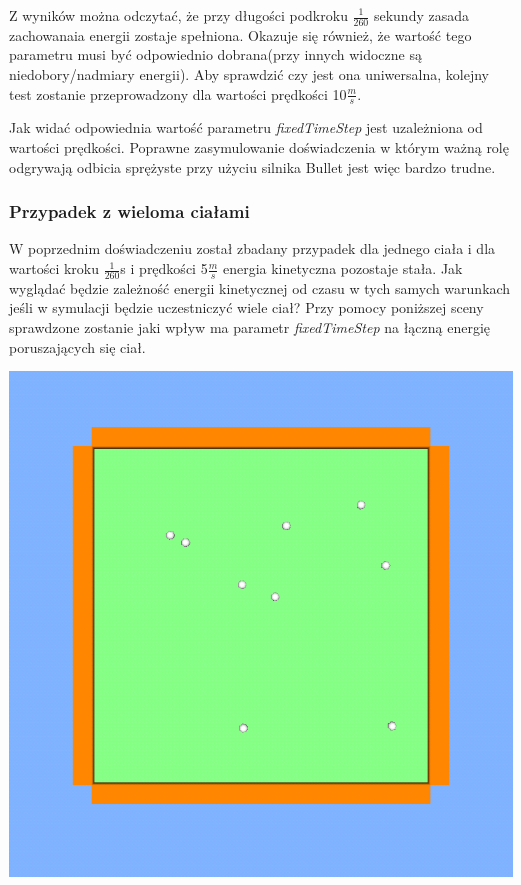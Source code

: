 Z wyników można odczytać, że przy długości podkroku $ \frac{1}{260} $ sekundy
zasada zachowanaia energii zostaje spełniona. Okazuje się również, że wartość
tego parametru musi być odpowiednio dobrana(przy innych widoczne są
niedobory/nadmiary energii). Aby sprawdzić czy jest ona uniwersalna, kolejny
test zostanie przeprowadzony dla wartości prędkości 10$\frac{m}{s}$.



Jak widać odpowiednia wartość parametru \emph{fixedTimeStep} jest uzależniona od
wartości prędkości. Poprawne zasymulowanie doświadczenia w którym ważną rolę
odgrywają odbicia sprężyste przy użyciu silnika Bullet jest więc bardzo trudne.

\subsubsection{Przypadek z wieloma ciałami}

W poprzednim doświadczeniu został zbadany przypadek dla jednego ciała i dla
wartości kroku $ \frac{1}{260} $s i prędkości 5$ \frac{m}{s} $ energia
kinetyczna pozostaje stała. Jak wyglądać będzie zależność energii kinetycznej od
czasu w tych samych warunkach jeśli w symulacji będzie uczestniczyć wiele ciał?
Przy pomocy poniższej sceny sprawdzone zostanie jaki wpływ ma parametr
\emph{fixedTimeStep} na łączną energię poruszających się ciał.

\includegraphics[width=\textwidth]{./img/shot_2.png}

